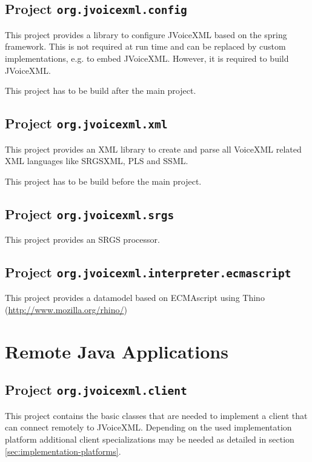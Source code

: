 \documentclass[11pt,a4paper]{article}
\begin{document}
\subsection{Project \texttt{org.jvoicexml.config}}
\label{sec:org.jvoicexml.config}

This project provides a library to configure JVoiceXML based on the spring
framework.
This is not required at run time and can be replaced by custom
implementations, e.g. to embed JVoiceXML. However, it is required to build
JVoiceXML.

This project has to be build after the main project.

\subsection{Project \texttt{org.jvoicexml.xml}}
\label{sec:org.jvoicexml.xml}

This project provides an XML library to create and parse all VoiceXML related
XML languages like SRGSXML, PLS and SSML.

This project has to be build before the main project.

\subsection{Project \texttt{org.jvoicexml.srgs}}
\label{sec:org.jvoicexml.srgs}

This project provides an SRGS processor.

\subsection{Project \texttt{org.jvoicexml.interpreter.ecmascript}}
\label{sec:org.jvoicexml.srgs}

This project provides a datamodel based on ECMAscript using Thino (\url{http://www.mozilla.org/rhino/})

\section{Remote Java Applications}
\subsection{Project \texttt{org.jvoicexml.client}}

This project contains the basic classes that are needed to implement a
client that can connect remotely to JVoiceXML. Depending on the used 
implementation platform additional client specializations may be needed
as detailed in section \ref{sec:implementation-platforms}.
\end{document}
